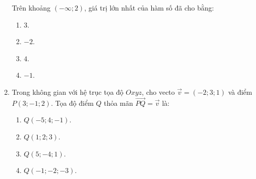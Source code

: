 \documentclass[12pt]{article}
\begin{document}
\begin{enumerate}[label=\textbf{Câu \arabic*.}, leftmargin=*]
\begin{center}
		\end{center}
		Trên khoảng $(-\infty; 2)$, giá trị lớn nhất của hàm số đã cho bằng:
		\begin{multicols}{4}
			\begin{enumerate}[label=\Alph*.]
				\item $3$.
				\item $-2$.
				\item $4$.
				\item $-1$.
			\end{enumerate}
		\end{multicols}
		
		\item Trong không gian với hệ trục tọa độ $Oxyz$, cho vecto $\vec{v} = (-2; 3; 1)$ và điểm $P(3; -1; 2)$. Tọa độ điểm $Q$ thỏa mãn $\overrightarrow{PQ} = \vec{v}$ là:
		\begin{multicols}{4}
			\begin{enumerate}[label=\Alph*.]
				\item $Q(-5; 4; -1)$.
				\item $Q(1; 2; 3)$.
				\item $Q(5; -4; 1)$.
				\item $Q(-1; -2; -3)$.
			\end{enumerate}
		\end{multicols}
		

\end{enumerate}
\end{document}
